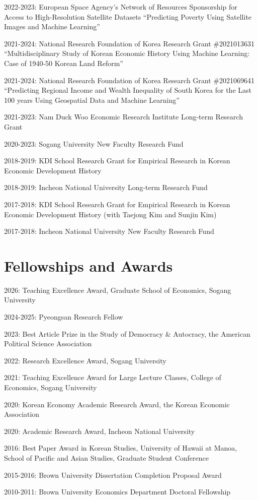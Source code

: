 \documentclass[a4paper,12pt]{article}
\renewenvironment{itemize}{
  \begin{list}{}{
    \setlength{\leftmargin}{1.5em}
  }
}{
  \end{list}
}
\begin{document}
\begin{itemize}
    \item 2022-2023: European Space Agency's Network of Resources Sponsorship for Access to High-Resolution Satellite Datasets ``Predicting Poverty Using Satellite Images and Machine Learning''
    \item 2021-2024: National Research Foundation of Korea Research Grant \#2021013631 ``Multidisciplinary Study of Korean Economic History Using Machine Learning: Case of 1940-50 Korean Land Reform''
	\item 2021-2024: National Research Foundation of Korea Research Grant \#2021069641 ``Predicting Regional Income and Wealth Inequality of South Korea for the Last 100 years Using Geospatial Data and Machine Learning''
	\item 2021-2023: Nam Duck Woo Economic Research Institute Long-term Research Grant
	\item 2020-2023: Sogang University New Faculty Research Fund
	\item 2018-2019: KDI School Research Grant for Empirical Research in Korean Economic Development History
   \item 2018-2019: Incheon National University Long-term Research Fund
  	\item 2017-2018: KDI School Research Grant for Empirical Research in Korean Economic Development History (with Taejong Kim and Sunjin Kim)
	\item 2017-2018: Incheon National University New Faculty Research Fund
\end{itemize}

\section*{Fellowships and Awards}

\begin{itemize}
    \item 2026: Teaching Excellence Award, Graduate School of Economics, Sogang University
    \item 2024-2025: Pyeongsan Research Fellow
    \item 2023: Best Article Prize in the Study of Democracy \& Autocracy, the American Political Science Association
    \item 2022: Research Excellence Award, Sogang University
    \item 2021: Teaching Excellence Award for Large Lecture Classes, College of Economics, Sogang University
	\item 2020: Korean Economy Academic Research Award, the Korean Economic Association
	\item 2020: Academic Research Award, Incheon National University
	\item 2016: Best Paper Award in Korean Studies, University of Hawaii at Manoa, School of Pacific and Asian Studies, Graduate Student Conference
	\item 2015-2016: Brown University Dissertation Completion Proposal Award
	\item 2010-2011: Brown University Economics Department Doctoral Fellowship
\end{itemize}
\end{document}
